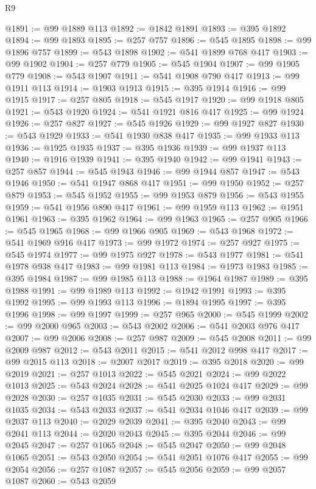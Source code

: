 \begin{lexlean}{R9}
\begin{coremodule}
@1891 := @99 @1889 @113
@1892 := @1842 @1891
@1893 := @395 @1892
@1894 := @99 @1893
@1895 := @257 @757
@1896 := @545 @1895
@1898 := @99 @1896 @757
@1899 := @543 @1898
@1902 := @541 @1899 @768 @417
@1903 := @99 @1902
@1904 := @257 @779
@1905 := @545 @1904
@1907 := @99 @1905 @779
@1908 := @543 @1907
@1911 := @541 @1908 @790 @417
@1913 := @99 @1911 @113
@1914 := @1903 @1913
@1915 := @395 @1914
@1916 := @99 @1915
@1917 := @257 @805
@1918 := @545 @1917
@1920 := @99 @1918 @805
@1921 := @543 @1920
@1924 := @541 @1921 @816 @417
@1925 := @99 @1924
@1926 := @257 @827
@1927 := @545 @1926
@1929 := @99 @1927 @827
@1930 := @543 @1929
@1933 := @541 @1930 @838 @417
@1935 := @99 @1933 @113
@1936 := @1925 @1935
@1937 := @395 @1936
@1939 := @99 @1937 @113
@1940 := @1916 @1939
@1941 := @395 @1940
@1942 := @99 @1941
@1943 := @257 @857
@1944 := @545 @1943
@1946 := @99 @1944 @857
@1947 := @543 @1946
@1950 := @541 @1947 @868 @417
@1951 := @99 @1950
@1952 := @257 @879
@1953 := @545 @1952
@1955 := @99 @1953 @879
@1956 := @543 @1955
@1959 := @541 @1956 @890 @417
@1961 := @99 @1959 @113
@1962 := @1951 @1961
@1963 := @395 @1962
@1964 := @99 @1963
@1965 := @257 @905
@1966 := @545 @1965
@1968 := @99 @1966 @905
@1969 := @543 @1968
@1972 := @541 @1969 @916 @417
@1973 := @99 @1972
@1974 := @257 @927
@1975 := @545 @1974
@1977 := @99 @1975 @927
@1978 := @543 @1977
@1981 := @541 @1978 @938 @417
@1983 := @99 @1981 @113
@1984 := @1973 @1983
@1985 := @395 @1984
@1987 := @99 @1985 @113
@1988 := @1964 @1987
@1989 := @395 @1988
@1991 := @99 @1989 @113
@1992 := @1942 @1991
@1993 := @395 @1992
@1995 := @99 @1993 @113
@1996 := @1894 @1995
@1997 := @395 @1996
@1998 := @99 @1997
@1999 := @257 @965
@2000 := @545 @1999
@2002 := @99 @2000 @965
@2003 := @543 @2002
@2006 := @541 @2003 @976 @417
@2007 := @99 @2006
@2008 := @257 @987
@2009 := @545 @2008
@2011 := @99 @2009 @987
@2012 := @543 @2011
@2015 := @541 @2012 @998 @417
@2017 := @99 @2015 @113
@2018 := @2007 @2017
@2019 := @395 @2018
@2020 := @99 @2019
@2021 := @257 @1013
@2022 := @545 @2021
@2024 := @99 @2022 @1013
@2025 := @543 @2024
@2028 := @541 @2025 @1024 @417
@2029 := @99 @2028
@2030 := @257 @1035
@2031 := @545 @2030
@2033 := @99 @2031 @1035
@2034 := @543 @2033
@2037 := @541 @2034 @1046 @417
@2039 := @99 @2037 @113
@2040 := @2029 @2039
@2041 := @395 @2040
@2043 := @99 @2041 @113
@2044 := @2020 @2043
@2045 := @395 @2044
@2046 := @99 @2045
@2047 := @257 @1065
@2048 := @545 @2047
@2050 := @99 @2048 @1065
@2051 := @543 @2050
@2054 := @541 @2051 @1076 @417
@2055 := @99 @2054
@2056 := @257 @1087
@2057 := @545 @2056
@2059 := @99 @2057 @1087
@2060 := @543 @2059

\end{coremodule}
\end{lexlean}
